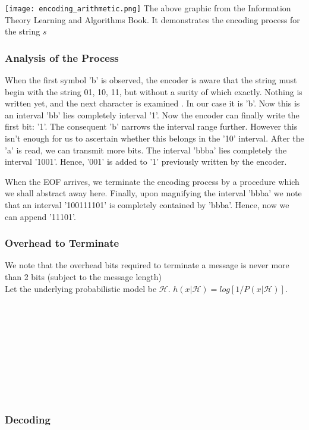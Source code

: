 \documentclass[10pt,twocolumn,letterpaper]{article}
\begin{document}
\texttt{[image: encoding\_arithmetic.png]}
The above graphic from the Information Theory Learning and Algorithms Book. 
It demonstrates the encoding process for the string $s$
\\ 
\subsubsection{Analysis of the Process}

When the first symbol 'b' is observed, the encoder is aware that the string must begin with the
string 01, 10, 11, but without a surity of which exactly. Nothing is written yet, and the next character is examined
. In our case it is 'b'. Now this is an interval 'bb' lies completely interval '1'. Now the encoder can finally write the first bit: '1'. 
The consequent 'b' narrows the interval range further. However this isn't enough for us to ascertain whether this belongs in the '10' interval. 
After the 'a' is read, we can transmit more bits. The interval 'bbba' lies completely the interval '1001'. 
Hence, '001' is added to '1' previously written by the encoder. 

When the EOF arrives, we terminate the encoding process by a procedure which we shall abstract away here. 
Finally, upon magnifying the interval 'bbba' we note that an interval '100111101' is completely contained by 'bbba'. Hence, now we can append '11101'.
\subsubsection{Overhead to Terminate}
We note that the overhead bits required to terminate a message is never more than 2 bits (subject to the message length)\\
Let the underlying probabilistic model be $\mathcal{H}$. $h(x \vert \mathcal{H}) = log[1/P(x | \mathcal{H})].$
\\
\\
\\
\\
\\
\\
\\
\\
\\
\\
\subsubsection{Decoding}
\end{document}
